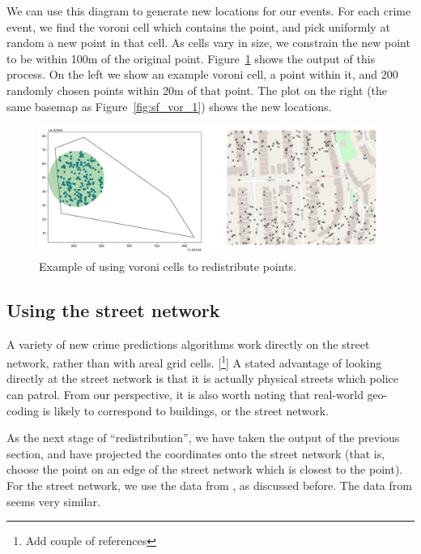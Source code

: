 \documentclass[twoside,a4paper,twocolumn,10pt]{article}
\theoremstyle{plain}
\theoremstyle{definition}
\begin{document}
We can use this diagram to generate new locations for our events.  For each crime event,
we find the voroni cell which contains the point, and pick uniformly at random a new point
in that cell.  As cells vary in size, we constrain the new point to be within 100m of the
original point.  Figure~\ref{fig:sf_vor_2} shows the output of this process.  On the left
we show an example voroni cell, a point within it, and 200 randomly chosen points within 20m
of that point.  The plot on the right (the same basemap as Figure~\ref{fig:sf_vor_1})
shows the new locations.

\begin{figure}
  \includegraphics[width=\textwidth]{sf_vor_2.png}
  \caption{Example of using voroni cells to redistribute points.}
  \label{fig:sf_vor_2}
\end{figure}


\subsection{Using the street network}

A variety of new crime predictions algorithms work directly on the street network, rather
than with areal grid cells.  [\footnote{Add couple of references}]
A stated advantage of looking directly at the street network is that it is actually
physical streets which police can patrol.  From our perspective, it is also worth noting
that real-world geo-coding is likely to correspond to buildings, or the street network.

As the next stage of ``redistribution'', we have taken the output of the previous section,
and have projected the coordinates onto the street network (that is, choose the point on an
edge of the street network which is closest to the point).  For the street network, we use
the data from \cite{sfgeo}, as discussed before.  The data from \cite{tiger} seems very similar.
\end{document}
